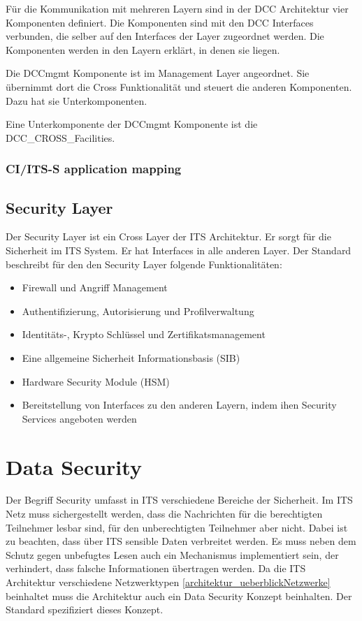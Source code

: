 Für die Kommunikation mit mehreren Layern sind in der  \ac{DCC} Architektur vier Komponenten definiert. Die Komponenten sind mit den \ac{DCC} Interfaces verbunden, die selber auf den Interfaces der Layer zugeordnet werden. Die Komponenten werden in den Layern erklärt, in denen sie liegen. 

Die DCCmgmt Komponente ist im Management Layer angeordnet. Sie übernimmt dort die Cross Funktionalität und steuert die anderen Komponenten. Dazu hat sie Unterkomponenten.

Eine Unterkomponente der DCCmgmt Komponente ist die DCC\_CROSS\_Facilities. 



\subsubsection{CI/ITS-S application mapping}

\subsection{Security Layer \label{architektur_securityLayer}}
Der Security Layer ist ein Cross Layer der \ac{ITS} Architektur. Er sorgt für die Sicherheit im \ac{ITS} System. Er hat Interfaces in alle anderen Layer. 	 
Der Standard \cite{en302665} beschreibt für den den Security Layer folgende Funktionalitäten:
\begin{itemize}
	\item Firewall und Angriff Management
	\item Authentifizierung, Autorisierung und Profilverwaltung
	\item Identitäts-, Krypto Schlüssel und Zertifikatsmanagement
	\item Eine allgemeine Sicherheit Informationsbasis (SIB)
	\item Hardware Security Module (HSM)
	\item Bereitstellung von Interfaces zu den anderen Layern, indem ihen Security Services angeboten werden
\end{itemize} 



\section{Data Security\label{architektur_dataSecurity}}
Der Begriff Security umfasst in \ac{ITS} verschiedene Bereiche der Sicherheit. Im \ac{ITS} Netz muss sichergestellt werden, dass die Nachrichten für die berechtigten Teilnehmer lesbar sind, für den unberechtigten Teilnehmer aber nicht. Dabei ist zu beachten, dass über \ac{ITS} sensible Daten verbreitet werden. Es muss neben dem Schutz gegen unbefugtes Lesen auch ein Mechanismus implementiert sein, der verhindert, dass falsche Informationen übertragen werden. Da die \ac{ITS} Architektur verschiedene Netzwerktypen \autoref{architektur_ueberblickNetzwerke} beinhaltet muss die Architektur auch ein Data Security Konzept beinhalten. Der Standard \cite{ts102940} spezifiziert dieses Konzept.  

